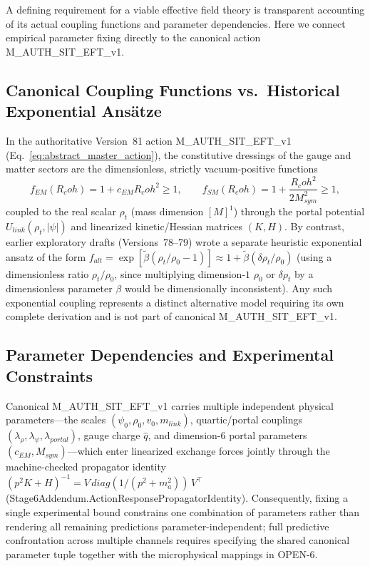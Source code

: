 \documentclass[american,11pt,letterpaper]{article}
\newcommand{\Rcoh}{R_{\mathrm{coh}}}
\def\mathrm#1{#1}%
\def\texttt#1{#1}%
\def\emph#1{#1}%
\def\Rcoh{R_coh}%
\begin{document}
A defining requirement for a viable effective field theory is transparent accounting of its actual coupling functions and parameter dependencies. Here we connect empirical parameter fixing directly to the canonical action \texttt{M\_AUTH\_SIT\_EFT\_v1}.

\subsection{Canonical Coupling Functions vs.\ Historical Exponential Ans\"atze}

In the authoritative Version~81 action \texttt{M\_AUTH\_SIT\_EFT\_v1} (Eq.~\eqref{eq:abstract_master_action}), the constitutive dressings of the gauge and matter sectors are the dimensionless, strictly vacuum-positive functions
\begin{equation}
f_{\mathrm{EM}}(\Rcoh) = 1 + c_{\mathrm{EM}}\Rcoh^2 \ge 1,
\qquad
f_{\mathrm{SM}}(\Rcoh) = 1 + \frac{\Rcoh^2}{2 M_{\mathrm{sym}}^2} \ge 1,
\end{equation}
coupled to the real scalar $\rho_t$ (mass dimension $[M]^1$) through the portal potential $U_{\mathrm{link}}(\rho_t, |\psi|)$ and linearized kinetic/Hessian matrices $(K, H)$. By contrast, earlier exploratory drafts (Versions~78--79) wrote a separate heuristic exponential ansatz of the form $f_{\mathrm{alt}} = \exp[\tilde{\beta}(\rho_t/\rho_0 - 1)] \approx 1 + \tilde{\beta}(\delta\rho_t/\rho_0)$ (using a dimensionless ratio $\rho_t/\rho_0$, since multiplying dimension-$1$ $\rho_0$ or $\delta\rho_t$ by a dimensionless parameter $\beta$ would be dimensionally inconsistent). Any such exponential coupling represents a \emph{distinct} alternative model requiring its own complete derivation and is not part of canonical \texttt{M\_AUTH\_SIT\_EFT\_v1}.

\subsection{Parameter Dependencies and Experimental Constraints}

Canonical \texttt{M\_AUTH\_SIT\_EFT\_v1} carries multiple independent physical parameters—the scales $(\psi_0, \rho_0, v_0, m_{\mathrm{link}})$, quartic/portal couplings $(\lambda_\rho, \lambda_\psi, \lambda_{\mathrm{portal}})$, gauge charge $\hat{q}$, and dimension-$6$ portal parameters $(c_{\mathrm{EM}}, M_{\mathrm{sym}})$—which enter linearized exchange forces jointly through the machine-checked propagator identity $(p^2 K + H)^{-1} = V\,\mathrm{diag}(1/(p^2+m_a^2))\,V^\top$ (\texttt{Stage6Addendum.\allowbreak{}ActionResponsePropagatorIdentity}). Consequently, fixing a single experimental bound constrains one combination of parameters rather than rendering all remaining predictions parameter-independent; full predictive confrontation across multiple channels requires specifying the shared canonical parameter tuple together with the microphysical mappings in \texttt{OPEN-6}.
\end{document}
